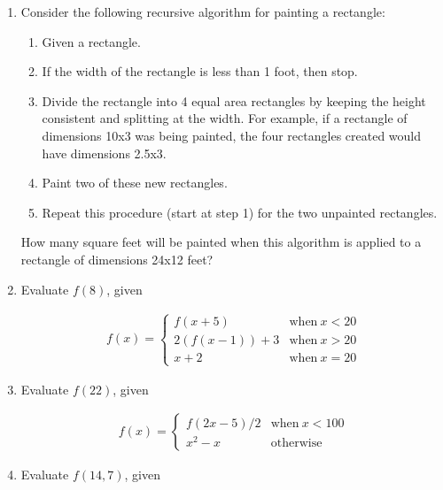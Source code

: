 \documentclass[12pt,letterpaper,fleqn]{article}
\begin{document}
\begin{enumerate}

\item Consider the following recursive algorithm for painting a rectangle:
  
  \begin{enumerate}

  \item Given a rectangle.

  \item If the width of the rectangle is less than 1 foot, then stop.

  \item Divide the rectangle into 4 equal area rectangles by keeping the height consistent and splitting at the width.
    For example, if a rectangle of dimensions 10x3 was being painted, the four rectangles created would have dimensions 2.5x3.

  \item Paint two of these new rectangles.

  \item Repeat this procedure (start at step 1) for the two unpainted rectangles.

  \end{enumerate}

  How many square feet will be painted when this algorithm is applied to a rectangle of dimensions 24x12 feet?

\item Evaluate $f(8)$, given

  \begin{align*}
    f(x) =
    \begin{cases}
      f(x + 5) & \text{when}\ x < 20 \\
      2(f(x - 1)) + 3 & \text{when}\ x > 20 \\
      x + 2 & \text{when}\ x = 20
    \end{cases}
  \end{align*}

\item Evaluate $f(22)$, given

  \begin{align*}
    f(x) =
    \begin{cases}
      f(2x - 5) / 2 & \text{when}\ x < 100 \\
      x^2 - x & \text{otherwise}
    \end{cases}
  \end{align*}

\item Evaluate $f(14, 7)$, given


\end{enumerate}
\end{document}
